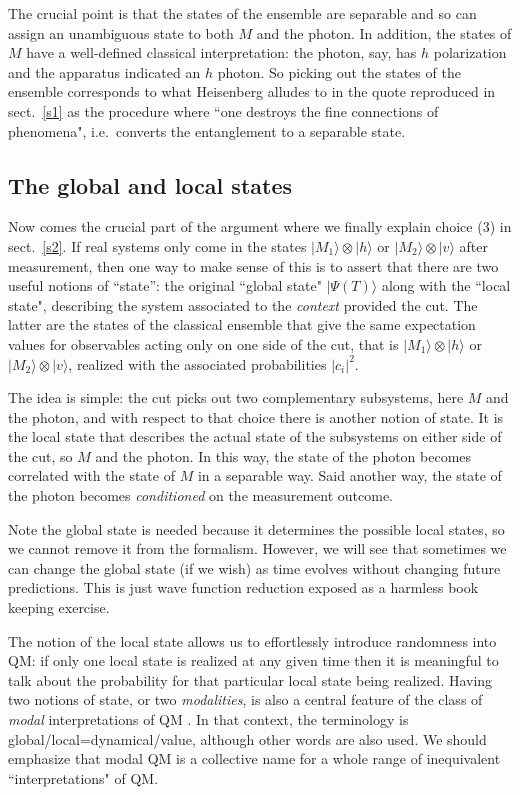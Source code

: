 \documentclass[12pt]{article}
\theoremstyle{plain}
\theoremstyle{definition}
\theoremstyle{remark}
\def\ket#1{| #1\rangle}
\begin{document}
The crucial point is that the states of the ensemble are separable and so can assign an unambiguous state to both $M$ and the photon. In addition, the states  of $M$ have a well-defined classical interpretation: the photon, say, has $h$ polarization and the apparatus indicated an $h$ photon. 
So picking out the states of the ensemble corresponds to what Heisenberg alludes to in the quote reproduced in sect.~\ref{s1} as the procedure where ``one destroys the fine connections of phenomena", i.e.~converts the entanglement to a separable state.

\subsection{The global and local states}\label{s4.2}

Now comes the crucial part of the argument where we finally explain choice (3) in sect.~\ref{s2}. If real systems only come in the states $\ket{M_1}\otimes\ket{h}$ or $\ket{M_2}\otimes\ket{v}$ after measurement, then one way to make sense of this is to assert that there are two useful notions of  ``state'': the original ``global state" $\ket{\Psi(T)}$ along with the ``local state", describing the system associated to the {\it context\/} provided the cut. The latter are the states of the classical ensemble that give the same expectation values for observables acting only on one side of the cut, that is $\ket{M_1}\otimes\ket{h}$ or $\ket{M_2}\otimes\ket{v}$, realized with the associated probabilities $|c_i|^2$. 

The idea is simple: the cut picks out two complementary subsystems, here $M$ and the photon, and with respect to that choice there is another notion of state. It is the local state that describes the actual state of the subsystems on either side of the cut, so $M$ and the photon. In this way, the state of the photon becomes correlated with the state of $M$ in a separable way. Said another way, the state of the photon becomes {\it conditioned\/} on the measurement outcome.

Note the global state is needed because it determines the possible local states, so we cannot remove it from the formalism. However, we will see that sometimes we can change the global state (if we wish) as time evolves without changing future predictions. This is just wave function reduction exposed as a harmless book keeping exercise.

The notion of the local state allows us to effortlessly introduce randomness into QM: if only one local state is realized at any given time then it is meaningful to talk about the probability for that particular local state being realized. Having two notions of state, or two {\it modalities\/}, is also a central feature of the class of {\it modal\/} interpretations of QM \cite{vanFraassen:1991qmmv,Vermaas:1999puqm}. In that context, the terminology is global/local=dynamical/value, although other words are also used. We should emphasize that modal QM is a collective name for a whole range of inequivalent ``interpretations" of QM.
\end{document}
